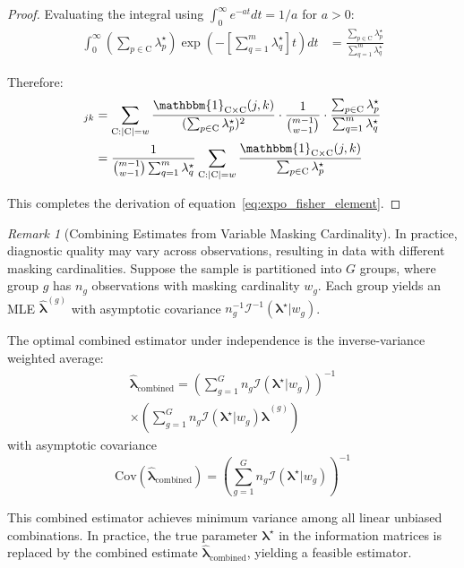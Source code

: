 \documentclass[12pt]{article}
\newcommand{\RV}[1]{\mathrm{#1}}
\newcommand{\cand}{\RV{C}}         %
\newcommand{\tparam}[1]{{#1}^{\star}}  %
\newcommand{\estimator}[1]{\hat{#1}}   %
\newcommand{\infomatrx}{\mathcal{I}}
\renewcommand{\vec}[1]{\boldsymbol{#1}}
\newcommand{\SetIndicator}[1]{\mathbbm{1}_{#1}}
\theoremstyle{definition}
\theoremstyle{remark}
\newtheorem{remark}[theorem]{Remark}
\begin{document}
\begin{proof}
Evaluating the integral using $\int_0^\infty e^{-at} dt = 1/a$ for $a > 0$:
\begin{align}
\int_0^\infty \left(\sum_{p \in \cand} \tparam{\lambda}_p\right) \exp\left(-\left[\sum_{q=1}^{m} \tparam{\lambda}_q\right] t\right) dt &= \frac{\sum_{p \in \cand} \tparam{\lambda}_p}{\sum_{q=1}^{m} \tparam{\lambda}_q}
\end{align}

Therefore:
\begin{align}
[\infomatrx(\tparam{\vec{\lambda}} | w)]_{jk} &= \sum_{\cand: |\cand|=w} \frac{\SetIndicator{\cand \times \cand}(j,k)}{(\sum_{p \in \cand} \tparam{\lambda}_p)^2} \cdot \frac{1}{\binom{m-1}{w-1}} \cdot \frac{\sum_{p \in \cand} \tparam{\lambda}_p}{\sum_{q=1}^{m} \tparam{\lambda}_q} \nonumber\\
&= \frac{1}{\binom{m-1}{w-1} \sum_{q=1}^{m} \tparam{\lambda}_q} \sum_{\cand: |\cand|=w} \frac{\SetIndicator{\cand \times \cand}(j,k)}{\sum_{p \in \cand} \tparam{\lambda}_p}
\end{align}

This completes the derivation of equation~\eqref{eq:expo_fisher_element}.
\end{proof}

\begin{remark}[Combining Estimates from Variable Masking Cardinality]
\label{rem:variable_w}
In practice, diagnostic quality may vary across observations, resulting in data with different masking cardinalities. Suppose the sample is partitioned into $G$ groups, where group $g$ has $n_g$ observations with masking cardinality $w_g$. Each group yields an MLE $\estimator{\vec{\lambda}}^{(g)}$ with asymptotic covariance $n_g^{-1}\infomatrx^{-1}(\tparam{\vec{\lambda}} | w_g)$.

The optimal combined estimator under independence is the inverse-variance weighted average:
\begin{multline}
\label{eq:combined_mle}
\estimator{\vec{\lambda}}_{\text{combined}} = \left(\sum_{g=1}^{G} n_g \infomatrx(\tparam{\vec{\lambda}} | w_g)\right)^{-1} \\
 \times \left(\sum_{g=1}^{G} n_g \infomatrx(\tparam{\vec{\lambda}} | w_g) \estimator{\vec{\lambda}}^{(g)}\right)
\end{multline}
with asymptotic covariance
\begin{equation}
\label{eq:combined_cov}
\mathrm{Cov}(\estimator{\vec{\lambda}}_{\text{combined}}) = \left(\sum_{g=1}^{G} n_g \infomatrx(\tparam{\vec{\lambda}} | w_g)\right)^{-1}
\end{equation}

This combined estimator achieves minimum variance among all linear unbiased combinations. In practice, the true parameter $\tparam{\vec{\lambda}}$ in the information matrices is replaced by the combined estimate $\estimator{\vec{\lambda}}_{\text{combined}}$, yielding a feasible estimator.
\end{remark}
\end{document}
